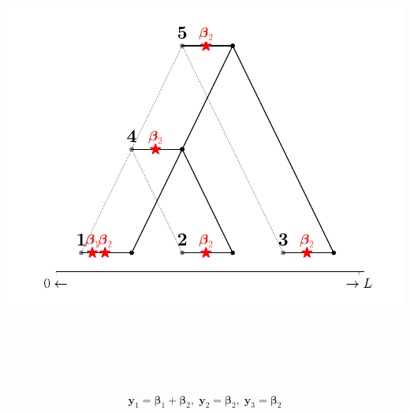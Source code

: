 \documentclass[
  letterpaper,
  DIV=11,
  numbers=noendperiod]{scrartcl}
\begin{document}
\includegraphics[width=\linewidth,height=6.25in,keepaspectratio]{slides_files/mediabag/imgs/tree-0.pdf}
\[
\mathbf{y}_1=\boldsymbol{\beta}_1+\boldsymbol{\beta}_2, \;
\mathbf{y}_2 = \boldsymbol{\beta}_2, \;
\mathbf{y}_3 = \boldsymbol{\beta}_2
\]
\end{document}
